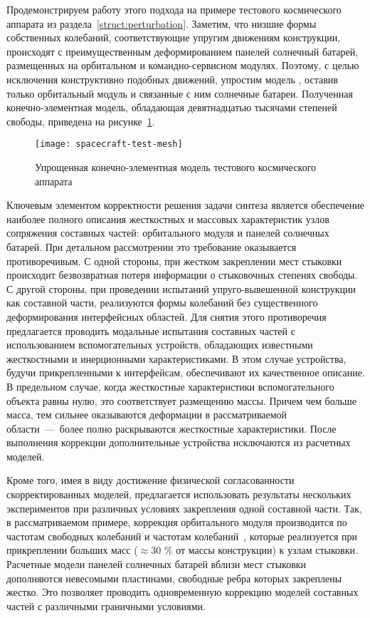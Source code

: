 Продемонстрируем работу этого подхода на примере тестового космического аппарата из раздела~\ref{struct:perturbation}. Заметим, что низшие формы собственных колебаний, соответствующие упругим движениям конструкции, происходят с преимущественным деформированием панелей солнечный батарей, размещенных на орбитальном и командно-сервисном модулях. Поэтому, с целью исключения конструктивно подобных движений, упростим модель , оставив только орбитальный модуль и связанные с ним солнечные батареи. Полученная конечно-элементная модель, обладающая девятнадцатью тысячами степеней свободы, приведена на рисунке~\ref{fig:spacecraft-test-mesh}.
\begin{figure}[!htb]
	\centering
	\texttt{[image: spacecraft-test-mesh]}
	\caption{Упрощенная конечно-элементная модель тестового космического аппарата} \label{fig:spacecraft-test-mesh}
\end{figure}

Ключевым элементом корректности решения задачи синтеза является обеспечение наиболее полного описания жесткостных и массовых характеристик узлов сопряжения составных частей: орбитального модуля и панелей солнечных батарей. При детальном рассмотрении это требование оказывается противоречивым. С одной стороны, при жестком закреплении мест стыковки происходит безвозвратная потеря информации о стыковочных степенях свободы. С другой стороны, при проведении испытаний упруго-вывешенной конструкции как составной части, реализуются формы колебаний без существенного деформирования интерфейсных областей. Для снятия этого противоречия предлагается проводить модальные испытания составных частей с использованием вспомогательных устройств, обладающих известными жесткостными и инерционными характеристиками. В этом случае устройства, будучи прикрепленными к интерфейсам, обеспечивают их качественное описание. В предельном случае, когда жесткостные характеристики вспомогательного объекта равны нулю, это соответствует размещению массы. Причем чем больше масса, тем сильнее оказываются деформации в рассматриваемой области~---~более полно раскрываются жесткостные характеристики. После выполнения коррекции дополнительные устройства исключаются из расчетных моделей.

Кроме того, имея в виду достижение физической согласованности скорректированных моделей, предлагается использовать результаты нескольких экспериментов при различных условиях закрепления одной составной части. Так, в рассматриваемом примере, коррекция орбитального модуля производится по частотам свободных колебаний и частотам колебаний~, которые реализуется при прикреплении больших масс ($ \approx 30 $ \% от массы конструкции) к узлам стыковки. Расчетные модели панелей солнечных батарей вблизи мест стыковки дополняются невесомыми пластинами, свободные ребра которых закреплены жестко. Это позволяет проводить одновременную коррекцию моделей составных частей с различными граничными условиями.

